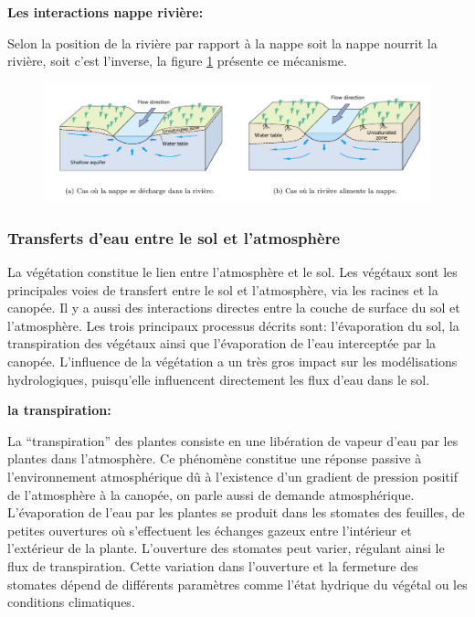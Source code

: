 \documentclass[a4paper,11pt]{article}
\numberwithin{equation}{section}
\begin{document}
\vspace{0.7cm}

\noindent\textbf{Les interactions nappe rivière:}

Selon la position de la rivière par rapport à la nappe soit la nappe nourrit la rivière, soit c'est l'inverse, la figure \ref{fig-nappe_riviere} présente ce mécanisme.

\begin{figure}[H]
	\begin{center}
		\includegraphics[scale=0.28]{nappe_riviere.png}
	\end{center}
	\label{fig-nappe_riviere}
\end{figure}

\subsubsection{Transferts d'eau entre le sol et l'atmosphère}
\label{ch:mecanismes}

La végétation constitue le lien entre l'atmosphère et le sol. Les végétaux sont les principales voies de transfert entre le sol et l'atmosphère, via les racines et la canopée. Il y a aussi des interactions directes entre la couche de surface du sol et l'atmosphère. Les trois principaux processus décrits sont: l'évaporation du sol, la transpiration des végétaux ainsi que l'évaporation de l'eau interceptée par la canopée. L'influence de la végétation a un très gros impact sur les modélisations hydrologiques, puisqu'elle influencent directement les flux d'eau dans le sol. 

\vspace{0.7cm}

\noindent\textbf{la transpiration:}

La ``transpiration'' des plantes consiste en une libération de vapeur d’eau par les plantes dans l’atmosphère. Ce phénomène constitue une réponse passive à l’environnement atmosphérique dû à l’existence d’un gradient de pression positif de l’atmosphère à la canopée, on parle aussi de demande atmosphérique. L’évaporation de l’eau par les plantes se produit dans les stomates des feuilles, de petites ouvertures où s’effectuent les échanges gazeux entre l’intérieur et l’extérieur de la plante. L’ouverture des stomates peut varier, régulant ainsi le flux de transpiration. Cette variation dans l’ouverture et la fermeture des stomates dépend de différents paramètres comme l’état hydrique du végétal ou les conditions climatiques.
\end{document}
